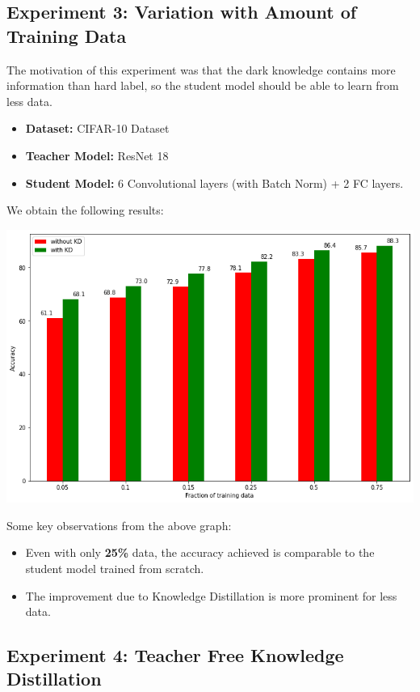 \documentclass{article} %
\begin{document}
	\subsection{Experiment 3: Variation with Amount of Training Data} 
	The motivation of this experiment was that the dark knowledge contains more information than hard label, so the student model should be able to learn from less data.
	\begin{itemize}
		\item \textbf{Dataset:} CIFAR-10 Dataset
		\item \textbf{Teacher Model:} ResNet 18
		\item \textbf{Student Model:} 6 Convolutional layers (with Batch Norm) + 2 FC layers.
	\end{itemize}
	We obtain the following results:
	
	\begin{center}
		\includegraphics[width=0.9\linewidth]{fig/kd_3.png}
	\end{center}
	
	Some key observations from the above graph:
	\begin{itemize}
		\item Even with only \textbf{25\%} data, the accuracy achieved is comparable to the student model trained from scratch.
		
		\item The improvement due to Knowledge Distillation is more prominent for less data.
	\end{itemize}
	
	
	\subsection{Experiment 4: Teacher Free Knowledge Distillation}
	
\end{document}
